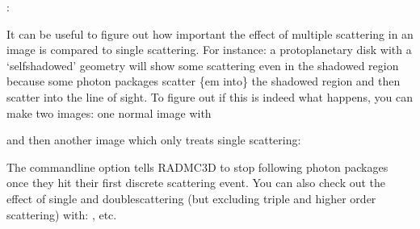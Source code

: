 \documentclass[letterpaper,10pt,english]{sphinxmanual}
\begin{document}
 :

\begin{sphinxVerbatim}[commandchars=\\\{\}]
  
\end{sphinxVerbatim}


It can be useful to figure out how important the effect of
multiple scattering in an image is compared to single scattering. For
instance: a protoplanetary disk with a ‘self\sphinxhyphen{}shadowed’ geometry will
show some scattering even in the shadowed region because some photon
packages scatter \{em into\} the shadowed region and then scatter into
the line of sight. To figure out if this is indeed what happens, you
can make two images: one normal image with

\begin{sphinxVerbatim}[commandchars=\\\{\}]
   
  
\end{sphinxVerbatim}

and then another image which only treats single scattering:

\begin{sphinxVerbatim}[commandchars=\\\{\}]
     
  
\end{sphinxVerbatim}

The command\sphinxhyphen{}line option  tells RADMC\sphinxhyphen{}3D to stop following photon
packages once they hit their first discrete scattering event. You can also check
out the effect of single\sphinxhyphen{} and double\sphinxhyphen{}scattering (but excluding triple and higher
order scattering) with: , etc.
\end{document}

